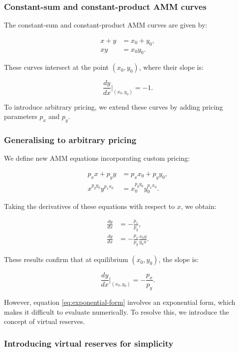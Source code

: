 \documentclass{article}
\begin{document}
\subsubsection{Constant-sum and constant-product AMM curves}

The constant-sum and constant-product AMM curves are given by:

\begin{align}
    x + y &= x_0 + y_0, \\
    xy &= x_0 y_0.
\end{align}

These curves intersect at the point \( (x_0, y_0) \), where their slope is:

\[
\frac{dy}{dx} \Big|_{(x_0, y_0)} = -1.
\]

To introduce arbitrary pricing, we extend these curves by adding pricing parameters \( p_x \) and \( p_y \).

\subsubsection{Generalising to arbitrary pricing}

We define new AMM equations incorporating custom pricing:

\begin{align}
    p_x x + p_y y &= p_x x_0 + p_y y_0, \\
    \label{eq:exponential-form}
    x^{p_y y_0} y^{p_x x_0} &= x_0^{p_y y_0} y_0^{p_x x_0}.
\end{align}

Taking the derivatives of these equations with respect to \( x \), we obtain:

\begin{align}
    \frac{dy}{dx} &= -\frac{p_x}{p_y}, \\
    \frac{dy}{dx} &= -\frac{p_x}{p_y} \frac{x_0 y}{y_0 x}.
\end{align}

These results confirm that at equilibrium \( (x_0, y_0) \), the slope is:

\[
\frac{dy}{dx} \Big|_{(x_0, y_0)} = -\frac{p_x}{p_y}.
\]

However, equation \eqref{eq:exponential-form} involves an exponential form, which makes it difficult to evaluate numerically. To resolve this, we introduce the concept of virtual reserves.

\subsubsection{Introducing virtual reserves for simplicity}
\end{document}
